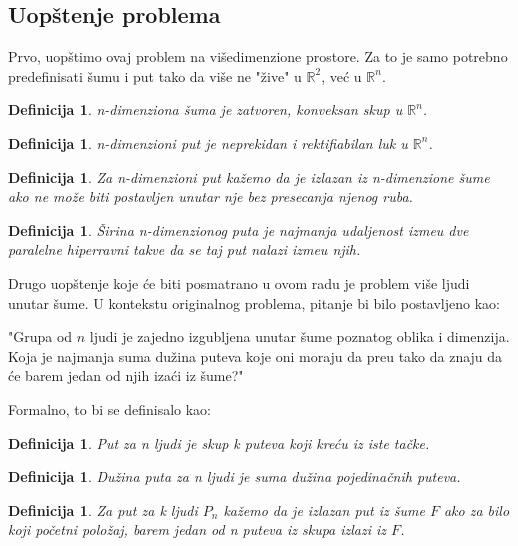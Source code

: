 \documentclass[11pt,letter]{article}
\newtheorem{df}[teo]{\bf Definicija}
\begin{document}
\subsection[Uop\v stenje problema]{Uop\v stenje problema}
\bigskip
Prvo, uop\v stimo ovaj problem na vi\v sedimenzione prostore. Za to je samo potrebno predefinisati \v sumu i put tako da vi\v se ne "\v zive" u $\mathbb{R}^2$, ve\' c u $\mathbb{R}^n$.
\smallskip
\begin{df} n-dimenziona \v suma je zatvoren, konveksan skup u $\mathbb{R}^n$.\end{df}
\begin{df} n-dimenzioni put je neprekidan i rektifiabilan luk u $\mathbb{R}^n$.\end{df}
\begin{df} Za n-dimenzioni put ka\v zemo da je izlazan iz n-dimenzione \v sume ako ne mo\v ze biti postavljen unutar nje bez presecanja njenog ruba.\end{df}
\begin{df} \v Sirina n-dimenzionog puta je najmanja udaljenost izme\dj u dve paralelne hiperravni takve da se taj put nalazi izme\dj u njih. \end{df}
\smallskip

\indent Drugo uop\v stenje koje \' ce biti posmatrano u ovom radu je problem vi\v se ljudi unutar \v sume. U kontekstu originalnog problema, pitanje bi bilo postavljeno kao:
\begin{center}
"Grupa od $n$ ljudi je zajedno izgubljena unutar \v sume poznatog oblika i dimenzija. Koja je najmanja suma du\v zina puteva koje oni moraju da pre\dj u tako da znaju da \' ce barem jedan od njih iza\' ci iz \v sume?"
\end{center}
\newpage
Formalno, to bi se definisalo kao:
\begin{df} Put za n ljudi je skup k puteva koji kre\' cu iz iste ta\v cke. \end{df}
\begin{df} Du\v zina puta za n ljudi je suma du\v zina pojedina\v cnih puteva.\end{df}
\begin{df} Za put za k ljudi $P_n$ ka\v zemo da je izlazan put iz \v sume $F$ ako za bilo koji po\v cetni polo\v zaj, barem jedan od n puteva iz skupa izlazi iz $F$.\end{df}
\smallskip
\end{document}
